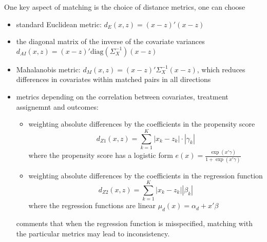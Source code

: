 \documentclass[twoside]{article}
\begin{document}
One key aspect of matching is the choice of distance metrics, one can choose 
\begin{itemize}
    \item standard Euclidean metric: $d_E\left(x,z\right)=\left(x-z\right)'\left(x-z\right)$
    \item the diagonal matrix of the inverse of the covariate variances $d_{AI}\left(x,z\right) = \left(x-z\right)'\mathrm{diag}\left(\Sigma^{-1}_X\right)\left(x-z\right)$
    \item Mahalanobis metric: $d_M(x,z) = \left(x-z\right)' \Sigma^{-1}_X \left(x-z\right)$, which reduces differences in covariates within matched pairs in all directions
    \item metrics depending on the correlation between covariates, treatment assignemnt and outcomes:
    \begin{itemize}
        \item weighting absolute differences by the coefficients in the propensity score $$d_{Z1}\left(x,z\right) = \sum^K_{k=1}\left\vert x_k-z_k \right\vert \cdot \left\vert \gamma_k \right\vert$$ where the propensity score has a logistic form $e(x) = \frac{\exp(x'\gamma)}{1+\exp(x'\gamma)}$
        \item weighting absolute differences by the coefficients in the regression function $$ d_{Z2}\left(x,z\right) = \sum^K_{k=1} \left\vert x_k-z_k \right\vert \left\vert \beta_k \right\vert $$ where the regression functions are linear $\mu_{d}(x) = \alpha_d  +x'\beta $
    \end{itemize}
    \citet{imbens2004nonparametric} comments that when the regression function is misspecified, matching with the particular metrics may lead to inconsistency.
\end{itemize}
\end{document}
